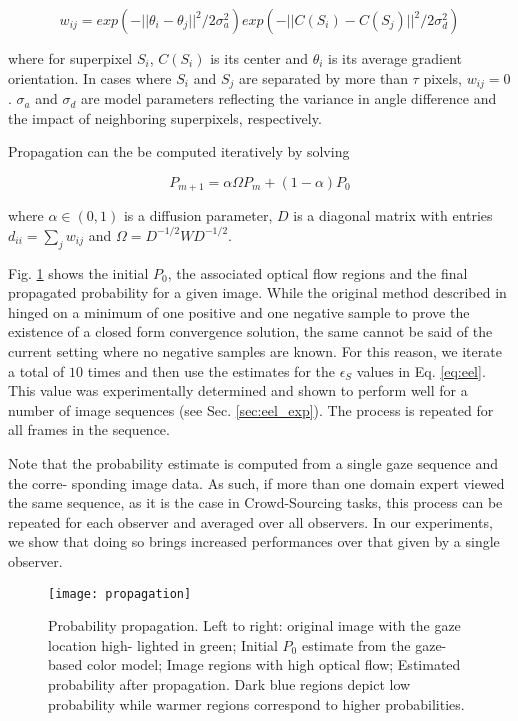 \begin{equation}
w_{ij} = exp(-||\theta_{i} - \theta_{j}||^2 / 2\sigma_{a}^{2}) exp(-||C(S_i) - C(S_j)||^2 / 2\sigma_{d}^{2})
\end{equation}

where for superpixel $S_{i}$, $C(S_{i})$ is its center and $\theta_{i}$ is its average gradient orientation.
In cases where $S_{i}$ and $S_{j}$ are separated by more than $\tau$ pixels, $w_{ij}=0$.
$\sigma_{a}$ and $\sigma_{d}$ are model parameters reflecting the variance in angle difference and the impact of neighboring superpixels, respectively.

Propagation can the be computed iteratively by solving

\begin{equation}
P_{m+1} = \alpha \Omega P_{m} + (1 - \alpha)P_{0}
\end{equation}

where $\alpha \in (0,1)$ is a diffusion parameter, $D$ is a diagonal matrix with entries $d_{ii}=\sum_{j}w_{ij}$ and $\Omega = D^{-1/2} W D^{-1/2}$.

Fig. \ref{fig:eel_propagation} shows the initial $P_{0}$, the associated optical flow regions and the final propagated probability for a given image.
While the original method described in \cite{zhou04} hinged on a minimum of one positive and one negative sample to prove the existence of a closed form convergence solution, the same cannot be said of the current setting where no negative samples are known.
For this reason, we iterate a total of $10$ times and then use the estimates for the $\epsilon_{S}$
values in Eq. \ref{eq:eel}.
This value was experimentally determined and shown to perform well for a
number of image sequences (see Sec. \ref{sec:eel_exp}).
The process is repeated for all frames in the sequence.

Note that the probability estimate is computed from a single gaze sequence and the corre-
sponding image data. As such, if more than one domain expert viewed the same sequence, as it
is the case in Crowd-Sourcing tasks, this process can be repeated for each observer and averaged
over all observers.
In our experiments, we show that doing so brings increased performances over that given by a single observer.

\begin{figure}[h]
\texttt{[image: propagation]}
\caption{Probability propagation. Left to right: original image with the gaze location high-
lighted in green; Initial $P_{0}$ estimate from the gaze-based color model; Image regions with high
optical flow; Estimated probability after propagation. Dark blue regions depict low probability
while warmer regions correspond to higher probabilities.}
\label{fig:eel_propagation}
\end{figure}


